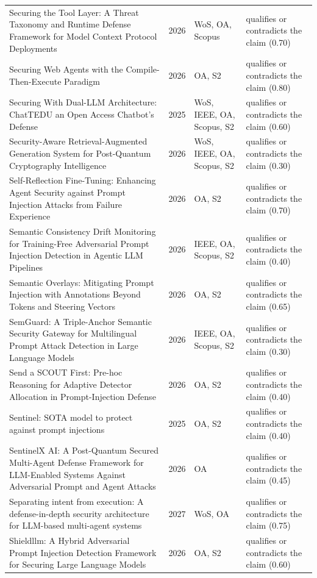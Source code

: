 \begin{longtable}{@{}%
  >{\raggedright\arraybackslash}p{}c%
  >{\raggedright\arraybackslash}p{}%
  >{\raggedright\arraybackslash}p{}@{}}
Securing the Tool Layer: A Threat Taxonomy and Runtime Defense Framework for Model Context Protocol Deployments & 2026 & WoS, OA, Scopus & qualifies or contradicts the claim (0.70) \\
Securing Web Agents with the Compile-Then-Execute Paradigm & 2026 & OA, S2 & qualifies or contradicts the claim (0.80) \\
Securing With Dual-LLM Architecture: ChatTEDU an Open Access Chatbot's Defense & 2025 & WoS, IEEE, OA, Scopus, S2 & qualifies or contradicts the claim (0.60) \\
Security-Aware Retrieval-Augmented Generation System for Post-Quantum Cryptography Intelligence & 2026 & WoS, IEEE, OA, Scopus, S2 & qualifies or contradicts the claim (0.30) \\
Self-Reflection Fine-Tuning: Enhancing Agent Security against Prompt Injection Attacks from Failure Experience & 2026 & OA, S2 & qualifies or contradicts the claim (0.70) \\
Semantic Consistency Drift Monitoring for Training-Free Adversarial Prompt Injection Detection in Agentic LLM Pipelines & 2026 & IEEE, OA, Scopus, S2 & qualifies or contradicts the claim (0.40) \\
Semantic Overlays: Mitigating Prompt Injection with Annotations Beyond Tokens and Steering Vectors & 2026 & OA, S2 & qualifies or contradicts the claim (0.65) \\
SemGuard: A Triple-Anchor Semantic Security Gateway for Multilingual Prompt Attack Detection in Large Language Models & 2026 & IEEE, OA, Scopus, S2 & qualifies or contradicts the claim (0.30) \\
Send a SCOUT First: Pre-hoc Reasoning for Adaptive Detector Allocation in Prompt-Injection Defense & 2026 & OA, S2 & qualifies or contradicts the claim (0.40) \\
Sentinel: SOTA model to protect against prompt injections & 2025 & OA, S2 & qualifies or contradicts the claim (0.40) \\
SentinelX AI: A Post-Quantum Secured Multi-Agent Defense Framework for LLM-Enabled Systems Against Adversarial Prompt and Agent Attacks & 2026 & OA & qualifies or contradicts the claim (0.45) \\
Separating intent from execution: A defense-in-depth security architecture for LLM-based multi-agent systems & 2027 & WoS, OA & qualifies or contradicts the claim (0.75) \\
Shieldllm: A Hybrid Adversarial Prompt Injection Detection Framework for Securing Large Language Models & 2026 & OA, S2 & qualifies or contradicts the claim (0.60) \\

\end{longtable}
